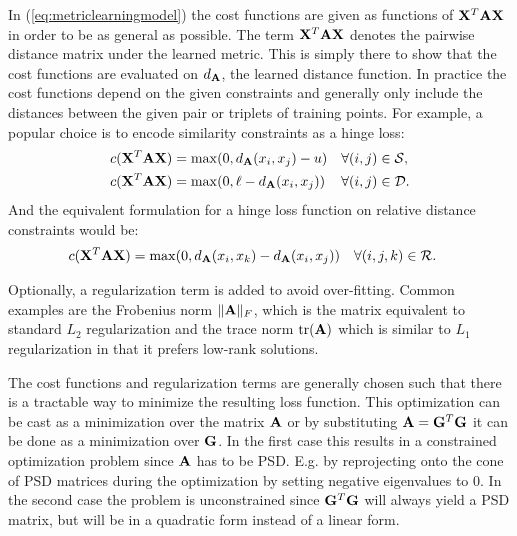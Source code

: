 In (\ref{eq:metriclearningmodel}) the cost functions are given as functions of $\mathbf{X}^T\mathbf{A}\mathbf{X}$ in order to be as general as possible. The term $\mathbf{X}^T\mathbf{A}\mathbf{X}$ denotes the pairwise distance matrix under the learned metric. This is simply there to show that the cost functions are evaluated on $d_{\mathbf{A}}$, the learned distance function. In practice the cost functions depend on the given constraints and generally only include the distances between the given pair or triplets of training points. For example, a popular choice is to encode similarity constraints as a hinge loss: 
\begin{align}
c(\mathbf{X}^T\mathbf{A}\mathbf{X}) &= \max(0,d_{\mathbf{A}}(x_i, x_j) - u)  &\forall (i,j) &\in \mathcal{S}, \\
c(\mathbf{X}^T\mathbf{A}\mathbf{X}) &= \max(0,\ell - d_{\mathbf{A}}(x_i, x_j)) &\forall (i,j) &\in \mathcal{D}.
\end{align}
And the equivalent formulation for a hinge loss function on relative distance constraints would be:
\begin{align}
c(\mathbf{X}^T\mathbf{A}\mathbf{X}) &= \max(0,d_{\mathbf{A}}(x_i, x_k) - d_{\mathbf{A}}(x_i, x_j)) &\forall (i,j,k) &\in \mathcal{R}.
\end{align}

Optionally, a regularization term is added to avoid over-fitting. Common examples are the Frobenius norm $\|\mathbf{A}\|_F$, which is the matrix equivalent to standard $L_2$ regularization and the trace norm $\text{tr}(\mathbf{A})$ which is similar to $L_1$ regularization in that it prefers low-rank solutions.

The cost functions and regularization terms are generally chosen such that there is a tractable way to minimize the resulting loss function. This optimization can be cast as a minimization over the matrix $\mathbf{A}$ or by substituting $\mathbf{A} = \mathbf{G}^T\mathbf{G}$ it can be done as a minimization over $\mathbf{G}$. In the first case this results in a constrained optimization problem since $\mathbf{A}$ has to be \ac{PSD}. E.g. by reprojecting onto the cone of \ac{PSD} matrices during the optimization  by setting negative eigenvalues to 0. In the second case the problem is unconstrained since $\mathbf{G}^T\mathbf{G}$ will always yield a \ac{PSD} matrix, but will be in a quadratic form instead of a linear form.










